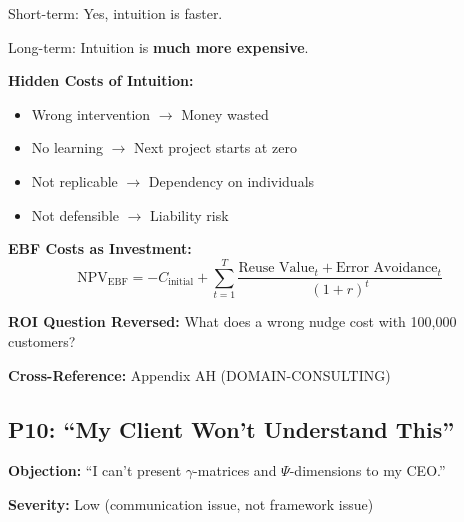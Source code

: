 \begin{axiom}
Short-term: Yes, intuition is faster.

Long-term: Intuition is \textbf{much more expensive}.

\textbf{Hidden Costs of Intuition:}
\begin{itemize}[nosep]
    \item Wrong intervention $\rightarrow$ Money wasted
    \item No learning $\rightarrow$ Next project starts at zero
    \item Not replicable $\rightarrow$ Dependency on individuals
    \item Not defensible $\rightarrow$ Liability risk
\end{itemize}

\textbf{EBF Costs as Investment:}
\begin{equation}
\text{NPV}_{\text{EBF}} = -C_{\text{initial}} + \sum_{t=1}^{T} \frac{\text{Reuse Value}_t + \text{Error Avoidance}_t}{(1+r)^t}
\end{equation}

\textbf{ROI Question Reversed:} What does a wrong nudge cost with 100,000 customers?
\end{axiom}

\textbf{Cross-Reference:} Appendix AH (DOMAIN-CONSULTING)

\subsection{P10: ``My Client Won't Understand This''}
\label{sec:da-p10}

\begin{tcolorbox}[colback=gray!5!white, colframe=gray!75!black]
\textbf{Objection:} ``I can't present $\gamma$-matrices and $\Psi$-dimensions to my CEO.''

\textbf{Severity:} Low (communication issue, not framework issue)
\end{tcolorbox}

